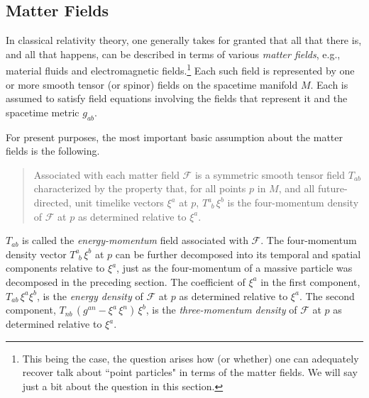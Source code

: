 \documentclass [12] {article}
\theoremstyle{plain}
\numberwithin{figure}{subsection}
\numberwithin{proposition}{subsection}
\begin{document}
\subsection{Matter Fields}\label{matter fields}

In classical relativity theory, one generally takes for granted that all that there is, and all that happens, can be described in terms of various \emph{matter fields}, e.g., material fluids and electromagnetic fields.\footnote{This being the case, the question arises how (or whether) one can adequately recover talk about ``point particles" in terms of the matter fields. We will say just a bit about the question in this section.}  Each such field is represented by one or more smooth tensor (or  spinor) fields on the spacetime manifold $M$. Each is assumed to satisfy field equations involving the fields that represent it and the spacetime metric $g_{ab}$.  

For present purposes, the most important basic assumption about the matter fields is the following. 
%
\begin{quotation} 
\noindent Associated with each matter field $\mathcal{F}$  is a symmetric smooth tensor field $T_{ab}$ characterized by the property that, for all points $p$ in $M$, and all future-directed, unit timelike vectors $\xi^a$ at $p$,  $T^a_{\ \  b} \,  \xi^b$  is the four-momentum density of $\mathcal{F}$ at $p$ as determined relative to $\xi^a$.
 \end{quotation}   
%
\noindent  $T_{ab}$ is called the \emph{energy-momentum} field associated with $\mathcal{F}$. The four-momentum density vector  $T^a_{\ \  b} \,  \xi^b$ at $p$ can be further decomposed into its temporal and spatial components relative to $\xi^a$, just as the four-momentum of a massive particle was decomposed in the preceding section.  The coefficient of $\xi^a$ in the first component,  $T_{ab} \, \xi^a  \xi^b$, is the \emph{energy density} of  $\mathcal{F}$ at $p$ as determined relative to $\xi^a$.  The second component, 
$T_{nb} \, (g^{an} - \xi^a \, \xi^n) \, \xi^b$, is the \emph{three-momentum density} of  $\mathcal{F}$ at $p$ as determined relative to $\xi^a$.  
\end{document}

